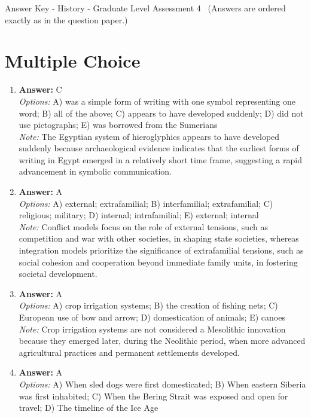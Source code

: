 \documentclass[12pt]{article}
\begin{document}
\begin{center}
Answer Key - History - Graduate Level Assessment 4 \
\small (Answers are ordered exactly as in the question paper.)
\end{center}

\section*{Multiple Choice}
\begin{enumerate}[label=\arabic*.]
\item \textbf{Answer:} C
\\ \textit{Options:} A) was a simple form of writing with one symbol representing one word; B) all of the above; C) appears to have developed suddenly; D) did not use pictographs; E) was borrowed from the Sumerians
\\ \textit{Note:} The Egyptian system of hieroglyphics appears to have developed suddenly because archaeological evidence indicates that the earliest forms of writing in Egypt emerged in a relatively short time frame, suggesting a rapid advancement in symbolic communication.
\item \textbf{Answer:} A
\\ \textit{Options:} A) external; extrafamilial; B) interfamilial; extrafamilial; C) religious; military; D) internal; intrafamilial; E) external; internal
\\ \textit{Note:} Conflict models focus on the role of external tensions, such as competition and war with other societies, in shaping state societies, whereas integration models prioritize the significance of extrafamilial tensions, such as social cohesion and cooperation beyond immediate family units, in fostering societal development.
\item \textbf{Answer:} A
\\ \textit{Options:} A) crop irrigation systems; B) the creation of fishing nets; C) European use of bow and arrow; D) domestication of animals; E) canoes
\\ \textit{Note:} Crop irrigation systems are not considered a Mesolithic innovation because they emerged later, during the Neolithic period, when more advanced agricultural practices and permanent settlements developed.
\item \textbf{Answer:} A
\\ \textit{Options:} A) When sled dogs were first domesticated; B) When eastern Siberia was first inhabited; C) When the Bering Strait was exposed and open for travel; D) The timeline of the Ice Age

\end{enumerate}
\end{document}
